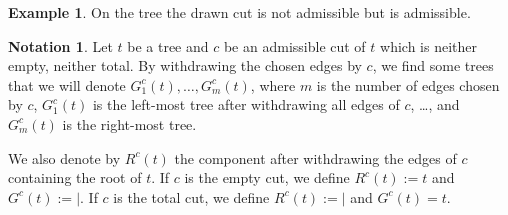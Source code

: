 \documentclass[10pt,a4paper]{amsart}
\numberwithin{equation}{section}
\theoremstyle{definition}
\newtheorem{Eg}[defi]{Example}
\newtheorem{Not}[defi]{Notation}
\theoremstyle{plain}
\begin{document}
\begin{Eg}
On the tree  the drawn cut is not admissible but  is admissible.
\end{Eg}
\begin{Not}
	Let $t$ be a tree and $c$ be an admissible cut of $t$ which is neither empty, neither total. By withdrawing the chosen edges by $c$, we find some trees that we will denote $G^c_1(t),\dots,G^c_m(t)$, where $m$ is the number of edges chosen by $c$, $G^c_1(t)$ is the left-most tree after withdrawing all edges of $c$, \dots, and $G^c_m(t)$ is the right-most tree.
	
	We also denote by $R^c(t)$ the component after withdrawing the edges of $c$ containing the root of $t$.
	If $c$ is the empty cut, we define $R^c(t):=t$ and $G^c(t):=|.$ If $c$ is the total cut, we define $R^c(t):=|$ and $G^c(t)=t.$
\end{Not}
\end{document}
